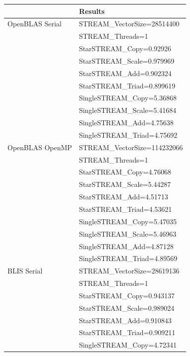 \documentclass{report}
\begin{document}
\begin{table}[H]
\begin{center}
\begin{tabular}{ |l|l| } 
\hline
                & Results \\ 
\hline
OpenBLAS Serial & STREAM\_VectorSize=28514400 \\
                & STREAM\_Threads=1 \\
                & StarSTREAM\_Copy=0.92926 \\
                & StarSTREAM\_Scale=0.979969 \\
                & StarSTREAM\_Add=0.902324 \\
                & StarSTREAM\_Triad=0.899619 \\
                & SingleSTREAM\_Copy=5.36868 \\
                & SingleSTREAM\_Scale=5.41684 \\
                & SingleSTREAM\_Add=4.75638 \\
                & SingleSTREAM\_Triad=4.75692 \\
\hline
OpenBLAS OpenMP & STREAM\_VectorSize=114232066 \\
                & STREAM\_Threads=1 \\
                & StarSTREAM\_Copy=4.76068 \\
                & StarSTREAM\_Scale=5.44287 \\
                & StarSTREAM\_Add=4.51713 \\
                & StarSTREAM\_Triad=4.53621 \\
                & SingleSTREAM\_Copy=5.47035 \\
                & SingleSTREAM\_Scale=5.46963 \\
                & SingleSTREAM\_Add=4.87128 \\
                & SingleSTREAM\_Triad=4.89569 \\
\hline
BLIS Serial     & STREAM\_VectorSize=28619136 \\
                & STREAM\_Threads=1 \\
                & StarSTREAM\_Copy=0.943137 \\
                & StarSTREAM\_Scale=0.989024 \\
                & StarSTREAM\_Add=0.910843 \\
                & StarSTREAM\_Triad=0.909211 \\
                & SingleSTREAM\_Copy=4.72341 \\

\end{tabular}
\end{center}
\end{table}
\end{document}
